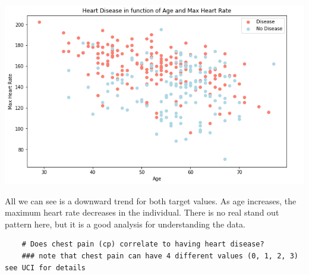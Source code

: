 \documentclass[11pt, a4paper]{article}
\begin{document}
\begin{spacing}{1.1}
\begin{minipage}[c]{9cm}
	\includegraphics[scale=.5]{scatt_hd}
	\end{minipage}
	\begin{minipage}[c]{8cm}
	All we can see is a downward trend for both target values. As age increases, the maximum heart rate decreases in the individual. There is no real stand out pattern here, but it is a good analysis for understanding the data. 
	\end{minipage} \newpage

	\begin{lstlisting}
	# Does chest pain (cp) correlate to having heart disease?
	### note that chest pain can have 4 different values (0, 1, 2, 3) see UCI for details
	

\end{lstlisting}
\end{spacing}
\end{document}
